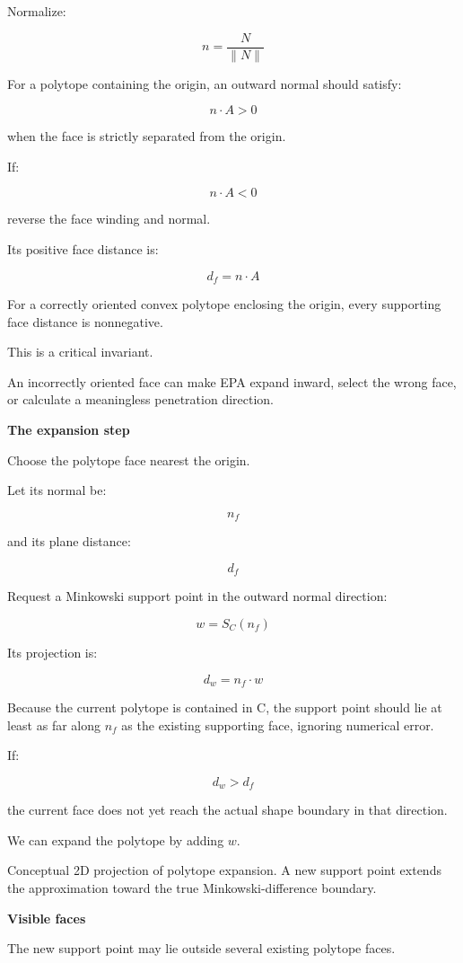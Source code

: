 Normalize:

\[
n=\frac N{\|N\|}
\]

For a polytope containing the origin, an outward normal should satisfy:

\[
n\cdot A>0
\]

when the face is strictly separated from the origin.

If:

\[
n\cdot A<0
\]

reverse the face winding and normal.

Its positive face distance is:

\[
\boxed{ d_f=n\cdot A }
\]

For a correctly oriented convex polytope enclosing the origin, every supporting face distance is nonnegative.

This is a critical invariant.

An incorrectly oriented face can make EPA expand inward, select the wrong face, or calculate a meaningless penetration direction.

\textbf{The expansion step}

Choose the polytope face nearest the origin.

Let its normal be:

\[
n_f
\]

and its plane distance:

\[
d_f
\]

Request a Minkowski support point in the outward normal direction:

\[
\boxed{ w=S_C(n_f) }
\]

Its projection is:

\[
\boxed{ d_w=n_f\cdot w }
\]

Because the current polytope is contained in C, the support point should lie at least as far along \(n_f\) as the existing supporting face, ignoring numerical error.

If:

\[
d_w>d_f
\]

the current face does not yet reach the actual shape boundary in that direction.

We can expand the polytope by adding \(w\).

Conceptual 2D projection of polytope expansion. A new support point extends the approximation toward the true Minkowski-difference boundary.

\textbf{Visible faces}

The new support point may lie outside several existing polytope faces.

